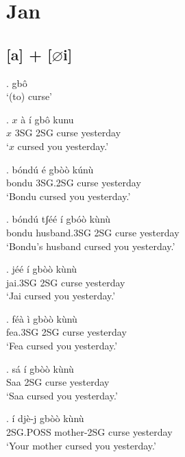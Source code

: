 \documentclass{assets/fieldnotes}
\begin{document}
\section{Jan}

\subsection{[a] + [$\varnothing$i]}

\ex. gbô \\
`(to) curse'

\ex. $x$ à í gbô kunu \\
$x$ 3SG 2SG curse yesterday \\
`$x$ cursed you yesterday.'

\exg. bóndú é gbòò kúnù \\
bondu 3SG.2SG curse yesterday \\
`Bondu cursed you yesterday.'


\ex. bóndú tʃéé í gbóò kùnù \\
bondu husband.3SG 2SG curse yesterday \\
`Bondu's husband cursed you yesterday.' 


\ex. jéé í gbòò kùnù \\
jai.3SG 2SG curse yesterday \\
`Jai cursed you yesterday.'


\ex. féà ì gbòò kùnù \\
fea.3SG 2SG curse yesterday \\
`Fea cursed you yesterday.'


\ex. sá í gbòò kùnù \\
Saa 2SG curse yesterday \\
`Saa cursed you yesterday.'

\ex. í djè-j gbòò kùnù \\
2SG.POSS mother-2SG curse yesterday \\
`Your mother cursed you yesterday.'
\end{document}
